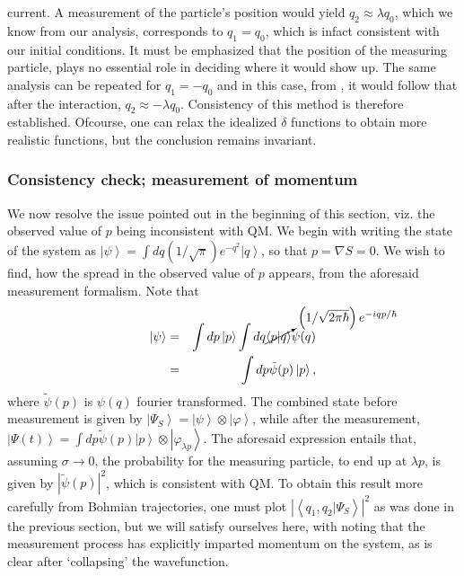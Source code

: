 current. A measurement of the particle's position would yield $q_{2}\approx\lambda q_{0}$,
which we know from our analysis, corresponds to $q_{1}=q_{0}$, which
is infact consistent with our initial conditions. It must be emphasized
that the position of the measuring particle, plays no essential role
in deciding where it would show up. The same analysis can be repeated
for $q_{1}=-q_{0}$ and in this case, from ,
it would follow that after the interaction, $q_{2}\approx-\lambda q_{0}$.
Consistency of this method is therefore established. Ofcourse, one
can relax the idealized $\delta$ functions to obtain more realistic
functions, but the conclusion remains invariant.


\subsubsection{Consistency check; measurement of momentum}

We now resolve the issue pointed out in the beginning of this section,
viz. the observed value of $p$ being inconsistent with QM. We begin
with writing the state of the system as $\left|\psi\right\rangle =\int dq\left(1/\sqrt{\pi}\right)e^{-q^{2}}\left|q\right\rangle $,
so that $p=\nabla S=0$. We wish to find, how the spread in the observed
value of $p$ appears, from the aforesaid measurement formalism. Note
that 
\begin{eqnarray*}
\left|\psi\right\rangle  & = & \int dp\left|p\right\rangle \int dq\cancelto{\left(1/\sqrt{2\pi\hbar}\right)e^{-iqp/\hbar}}{\left\langle p|q\right\rangle }\psi(q)\\
 & = & \int dp\tilde{\psi}(p)\left|p\right\rangle ,
\end{eqnarray*}
where $\tilde{\psi}(p)$ is $\psi(q)$ fourier transformed. The combined
state before measurement is given by $\left|\Psi_{S}\right\rangle =\left|\psi\right\rangle \otimes\left|\varphi\right\rangle $,
while after the measurement, $\left|\Psi(t)\right\rangle =\int dp\tilde{\psi}(p)\left|p\right\rangle \otimes\left|\varphi_{\lambda p}\right\rangle $.
The aforesaid expression entails that, assuming $\sigma\to0$, the
probability for the measuring particle, to end up at $\lambda p$,
is given by $\left|\tilde{\psi}(p)\right|^{2}$, which is consistent
with QM. To obtain this result more carefully from Bohmian trajectories,
one must plot $\left|\left\langle q_{1},q_{2}|\Psi_{S}\right\rangle \right|^{2}$
as was done in the previous section, but we will satisfy ourselves
here, with noting that the measurement process has explicitly imparted
momentum on the system, as is clear after `collapsing' the wavefunction.


